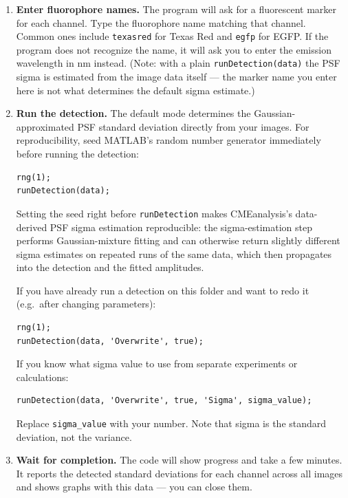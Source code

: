 \documentclass[11pt]{article}
\newcommand{\code}[1]{\texttt{#1}}
\begin{document}
\begin{enumerate}[leftmargin=*]
    \item \textbf{Enter fluorophore names.} The program will ask for a
    fluorescent marker for each channel. Type the fluorophore name
    matching that channel. Common ones include \code{texasred} for
    Texas Red and \code{egfp} for EGFP. If the program does not
    recognize the name, it will ask you to enter the emission
    wavelength in nm instead. (Note: with a plain
    \code{runDetection(data)} the PSF sigma is estimated from the
    image data itself --- the marker name you enter here is not what
    determines the default sigma estimate.)

    \item \textbf{Run the detection.} The default mode determines the
    Gaussian-approximated PSF standard deviation directly from your
    images. For reproducibility, seed MATLAB's random number
    generator immediately before running the detection:

    \begin{lstlisting}
rng(1);
runDetection(data);
    \end{lstlisting}

    Setting the seed right before \code{runDetection} makes
    CMEanalysis's data-derived PSF sigma estimation reproducible: the
    sigma-estimation step performs Gaussian-mixture fitting and can
    otherwise return slightly different sigma estimates on repeated
    runs of the same data, which then propagates into the detection
    and the fitted amplitudes.

    If you have already run a detection on this folder and want to
    redo it (e.g.\ after changing parameters):

    \begin{lstlisting}
rng(1);
runDetection(data, 'Overwrite', true);
    \end{lstlisting}

    If you know what sigma value to use from separate experiments or
    calculations:

    \begin{lstlisting}
runDetection(data, 'Overwrite', true, 'Sigma', sigma_value);
    \end{lstlisting}

    Replace \code{sigma\_value} with your number. Note that sigma is
    the standard deviation, not the variance.

    \item \textbf{Wait for completion.} The code will show progress
    and take a few minutes. It reports the detected standard
    deviations for each channel across all images and shows graphs
    with this data --- you can close them.
\end{enumerate}
\end{document}
